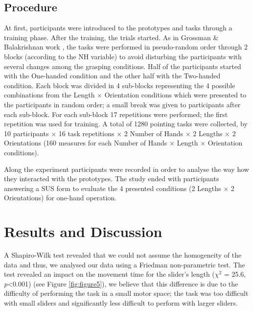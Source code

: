 \documentclass{sigchi}
\begin{document}
\subsection{Procedure}
At first, participants were introduced to the prototypes and tasks through a training phase. After the training, the trials started. As in Grossman \& Balakrishnan work \cite{Grossman:2005:BCE:1054972.1055012}, the tasks were performed in pseudo-random order through 2 blocks (according to the NH variable) to avoid disturbing the participants with several changes among the grasping conditions. Half of the participants started with the One-handed condition and the other half with the Two-handed condition. Each block was divided in 4 sub-blocks representing the 4 possible combinations from the Length $\times$ Orientation conditions which were presented to the participants in random order; a small break was given to participants after each sub-block. For each sub-block 17 repetitions were performed; the first repetition was used for training. A total of 1280 pointing tasks were collected, by 10 participants $\times$ 16 task repetitions $\times$ 2 Number of Hands $\times$ 2 Lengths $\times$ 2 Orientations (160 measures for each Number of Hands $\times$ Length $\times$ Orientation conditions).

Along the experiment participants were recorded in order to analyse the way how they interacted with the prototypes. The study ended with participants answering a SUS form to evaluate the 4 presented conditions (2 Lengths $\times$ 2 Orientations) for one-hand operation.

\section{Results and Discussion}
A Shapiro-Wilk test revealed that we could not assume the homogeneity of the data and thus, we analysed our data using a Friedman non-parametric test. The test revealed an impact on the movement time for the slider’s length ($\chi^2$ = 25.6, \textit{p}<0.001) (see Figure \ref{fig:figure5}), we believe that this difference is due to the difficulty of performing the task in a small motor space; the task was too difficult with small sliders and significantly less difficult to perform with larger sliders.
\end{document}
